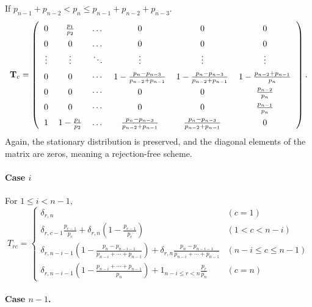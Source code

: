 \documentclass[12pt]{article}
\begin{document}
If $p_{n-1} + p_{n-2} < p_n \le p_{n-1} + p_{n-2} + p_{n-3}$.
$$
  \mathbf T_{c}
=
\left(
  \arraycolsep=6.0pt\def\arraystretch{1.5}
  \begin{array}{ccccccc}
    0  & \frac{p_1}{p_2}   &   \dots  & 0  & 0 & 0\\
    0  &   0   &   \dots  &  0 & 0 & 0\\
    \vdots&\vdots &   \ddots &   \vdots & \vdots & \vdots \\
    0 & 0 &   \cdots &
    1 - \frac{ p_n - p_{n-3} } { p_{n-2} + p_{n-1}} &
    1 - \frac{ p_n - p_{n-3} } { p_{n-2} + p_{n-1}} &
    1 - \frac{p_{n-2} + p_{n-1}}{p_n}\\
    0 & 0 &   \cdots &  0 & 0 & \frac{p_{n-2}}{p_n}\\
    0 & 0 &   \cdots &  0 & 0 & \frac{p_{n-1}}{p_n}\\
    1 &  1 - \frac{p_1}{p_2} &   \dots  &
    \frac{p_n - p_{n-3}}{p_{n-2} + p_{n-1}} &
    \frac{p_n - p_{n-3}}{p_{n-2} + p_{n-1}} & 0
  \end{array}
\right).
$$
Again, the stationary distribution is preserved,
and the diagonal elements of the matrix are zeros,
meaning a rejection-free scheme.


\paragraph{Case $i$}

For $1 \le i < n - 1$,
\begin{equation}
  T_{rc}
=
\begin{cases}
  \delta_{r, n}
  & (c = 1)
  \\
  \delta_{r, c-1}\frac{p_{c-1}}{p_c}
  + \delta_{r, n}\left(1 - \frac{p_{c-1}}{p_c} \right)
  & (1 < c < n - i)
  \\
  \delta_{r, n-i-1}\left(1 - \frac{p_n - p_{n-i-1} }{ p_{n-i} + \cdots + p_{n-1} } \right)
  + \delta_{r, n} \frac{p_n - p_{n-i-1} }{ p_{n-i} + \cdots + p_{n-1} }
  & (n - i \le c \le n - 1)
  \\
  \delta_{r, n-i-1}\left(1 - \frac{ p_{n-i} + \cdots + p_{n-1} }{p_n} \right)
  + 1_{n-i \le r < n} \frac{p_r }{ p_n }
  & (c = n)
\end{cases}
\end{equation}


\paragraph{Case $n-1$.}
\end{document}
